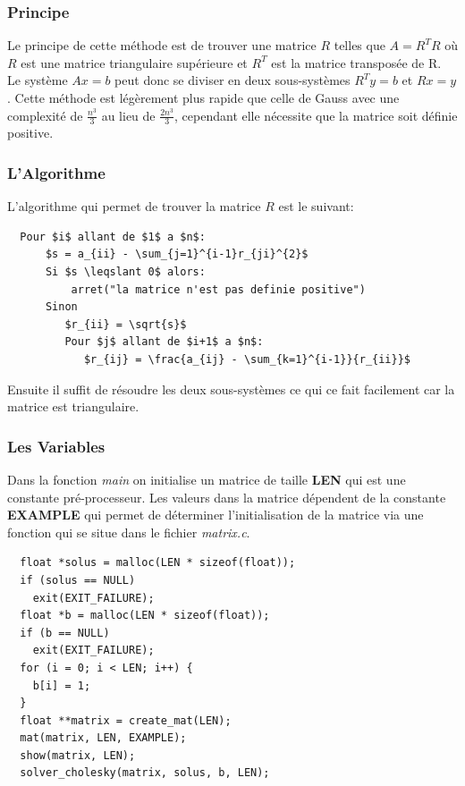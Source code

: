\documentclass[a4paper]{article}
\begin{document}
\subsubsection{Principe}

Le principe de cette méthode est de trouver une matrice $R$ telles que $A =
R^{T}R$ où $R$ est une matrice triangulaire supérieure et $R^{T}$ est la matrice
transposée de R. Le système $Ax = b$ peut donc se diviser en deux sous-systèmes
$R^{T}y = b$ et $Rx = y$. Cette méthode est légèrement plus rapide que celle de
Gauss avec une complexité de $\frac{n^{3}}{3}$ au lieu de $\frac{2n^{3}}{3}$,
cependant elle nécessite que la matrice soit définie positive.

\subsubsection{L'Algorithme}

L'algorithme qui permet de trouver la matrice $R$ est le suivant:

\begin{lstlisting}
  Pour $i$ allant de $1$ a $n$:
      $s = a_{ii} - \sum_{j=1}^{i-1}r_{ji}^{2}$
      Si $s \leqslant 0$ alors:
          arret("la matrice n'est pas definie positive")
      Sinon
         $r_{ii} = \sqrt{s}$
         Pour $j$ allant de $i+1$ a $n$:
            $r_{ij} = \frac{a_{ij} - \sum_{k=1}^{i-1}}{r_{ii}}$
\end{lstlisting}

Ensuite il suffit de résoudre les deux sous-systèmes ce qui ce fait facilement
car la matrice est triangulaire.

\subsubsection{Les Variables}

Dans la fonction \textit{main} on initialise un matrice de taille
\textbf{LEN} qui est une constante pré-processeur. Les valeurs dans la matrice
dépendent de la constante \textbf{EXAMPLE} qui permet de déterminer
l’initialisation de la matrice via une fonction qui se situe dans le fichier
\textit{matrix.c}.

\begin{lstlisting}
  float *solus = malloc(LEN * sizeof(float));
  if (solus == NULL)
    exit(EXIT_FAILURE);
  float *b = malloc(LEN * sizeof(float));
  if (b == NULL)
    exit(EXIT_FAILURE);
  for (i = 0; i < LEN; i++) {
    b[i] = 1;
  }
  float **matrix = create_mat(LEN);
  mat(matrix, LEN, EXAMPLE);
  show(matrix, LEN);
  solver_cholesky(matrix, solus, b, LEN);
\end{lstlisting}
\end{document}
